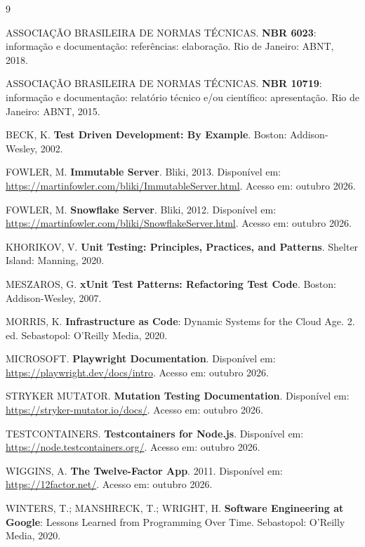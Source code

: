\documentclass[12pt,a4paper]{article}
\begin{document}
\newpage
\renewcommand{\refname}{\centering REFERÊNCIAS}
\begin{thebibliography}{9}

ASSOCIAÇÃO BRASILEIRA DE NORMAS TÉCNICAS. \textbf{NBR 6023}: informação e documentação: referências: elaboração. Rio de Janeiro: ABNT, 2018.

ASSOCIAÇÃO BRASILEIRA DE NORMAS TÉCNICAS. \textbf{NBR 10719}: informação e documentação: relatório técnico e/ou científico: apresentação. Rio de Janeiro: ABNT, 2015.

BECK, K. \textbf{Test Driven Development: By Example}. Boston: Addison-Wesley, 2002.

FOWLER, M. \textbf{Immutable Server}. Bliki, 2013. Disponível em: \url{https://martinfowler.com/bliki/ImmutableServer.html}. Acesso em: outubro 2026.

FOWLER, M. \textbf{Snowflake Server}. Bliki, 2012. Disponível em: \url{https://martinfowler.com/bliki/SnowflakeServer.html}. Acesso em: outubro 2026.

KHORIKOV, V. \textbf{Unit Testing: Principles, Practices, and Patterns}. Shelter Island: Manning, 2020.

MESZAROS, G. \textbf{xUnit Test Patterns: Refactoring Test Code}. Boston: Addison-Wesley, 2007.

MORRIS, K. \textbf{Infrastructure as Code}: Dynamic Systems for the Cloud Age. 2. ed. Sebastopol: O'Reilly Media, 2020.

MICROSOFT. \textbf{Playwright Documentation}. Disponível em: \url{https://playwright.dev/docs/intro}. Acesso em: outubro 2026.

STRYKER MUTATOR. \textbf{Mutation Testing Documentation}. Disponível em: \url{https://stryker-mutator.io/docs/}. Acesso em: outubro 2026.

TESTCONTAINERS. \textbf{Testcontainers for Node.js}. Disponível em: \url{https://node.testcontainers.org/}. Acesso em: outubro 2026.

WIGGINS, A. \textbf{The Twelve-Factor App}. 2011. Disponível em: \url{https://12factor.net/}. Acesso em: outubro 2026.

WINTERS, T.; MANSHRECK, T.; WRIGHT, H. \textbf{Software Engineering at Google}: Lessons Learned from Programming Over Time. Sebastopol: O'Reilly Media, 2020.

\end{thebibliography}
\end{document}
